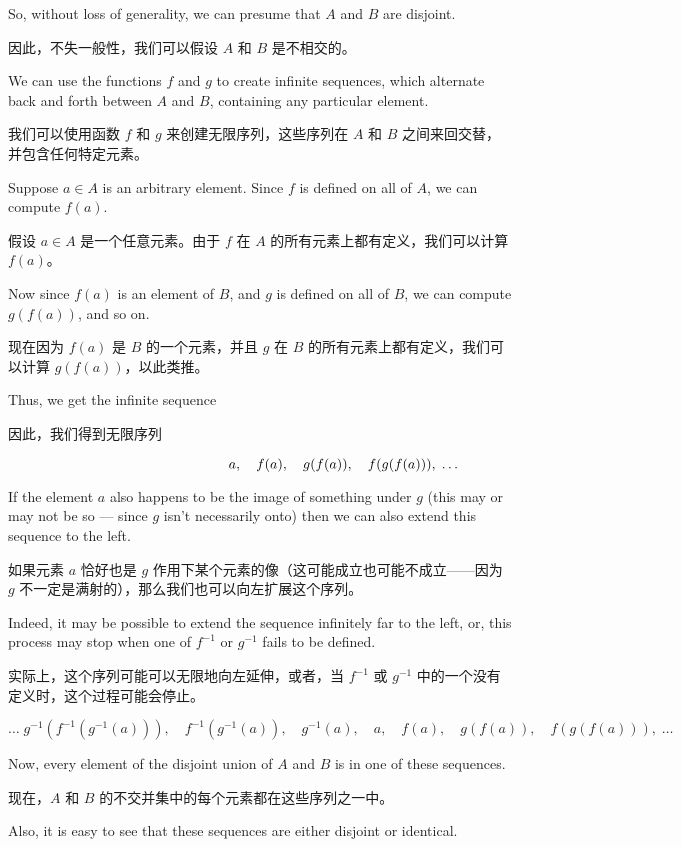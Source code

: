 So, without
loss of generality, we can presume that $A$ and $B$ are disjoint.

因此，不失一般性，我们可以假设 $A$ 和 $B$ 是不相交的。

We can use
the functions $f$ and $g$ to create infinite sequences, which
alternate back and
forth between $A$ and $B$, containing any particular element.

我们可以使用函数 $f$ 和 $g$ 来创建无限序列，这些序列在 $A$ 和 $B$ 之间来回交替，并包含任何特定元素。

Suppose  $a \in A$ is an arbitrary element.  Since $f$ is defined
on all of $A$, we
can compute $f(a)$.

假设 $a \in A$ 是一个任意元素。由于 $f$ 在 $A$ 的所有元素上都有定义，我们可以计算 $f(a)$。

Now since $f(a)$ is an element of $B$, and $g$ is
defined on all
of $B$, we can compute $g(f(a))$, and so on.

现在因为 $f(a)$ 是 $B$ 的一个元素，并且 $g$ 在 $B$ 的所有元素上都有定义，我们可以计算 $g(f(a))$，以此类推。

Thus, we get the
infinite sequence

因此，我们得到无限序列

\[ \rule{120pt}{0pt} a, \quad  f(a), \quad g(f(a)), \quad f(g(f(a))), \;
    \ldots \]

If the element $a$ also happens to be the image of something under $g$ (this
may or may not be so --- since $g$ isn't necessarily onto) then we
can also extend
this sequence to the left.

如果元素 $a$ 恰好也是 $g$ 作用下某个元素的像（这可能成立也可能不成立——因为 $g$ 不一定是满射的），那么我们也可以向左扩展这个序列。

Indeed, it may be possible to
extend the sequence infinitely far to the left, or, this
process may stop when one of $f^{-1}$ or $g^{-1}$
fails to be defined.

实际上，这个序列可能可以无限地向左延伸，或者，当 $f^{-1}$ 或 $g^{-1}$ 中的一个没有定义时，这个过程可能会停止。

\[
    \ldots \; g^{-1}(f^{-1}(g^{-1}(a))), \quad f^{-1}(g^{-1}(a)), \quad g^{-1}(a), \quad a, \quad  f(a), \quad  g(f(a)), \quad f(g(f(a))),\;
    \ldots \]

Now, every element of the disjoint union of $A$ and $B$ is in one of these
sequences.

现在，$A$ 和 $B$ 的不交并集中的每个元素都在这些序列之一中。

Also, it is easy to see that these sequences are either disjoint
or identical.

